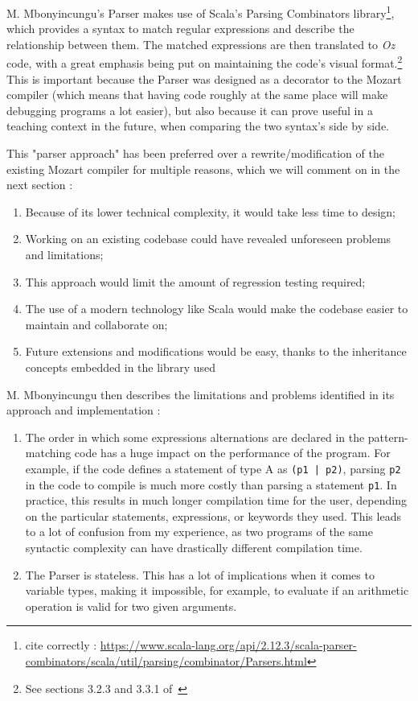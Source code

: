 M. Mbonyincungu's Parser makes use of Scala's Parsing Combinators library\footnote{cite correctly : \url{https://www.scala-lang.org/api/2.12.3/scala-parser-combinators/scala/util/parsing/combinator/Parsers.html}}, which provides a syntax to match regular expressions and describe the relationship between them.
The matched expressions are then translated to \textit{Oz} code, with a great emphasis being put on maintaining the code's visual format.\footnote{See sections 3.2.3 and 3.3.1 of~\cite{jpthesis}}
This is important because the Parser was designed as a decorator to the Mozart compiler (which means that having code roughly at the same place will make debugging programs a lot easier), but also because it can prove useful in a teaching context in the future, when comparing the two syntax's side by side.

This "parser approach" has been preferred over a rewrite/modification of the existing Mozart compiler for multiple reasons, which we will comment on in the next section :
\begin{enumerate}
    \item Because of its lower technical complexity, it would take less time to design;
    \item Working on an existing codebase could have revealed unforeseen problems and limitations;
    \item This approach would limit the amount of regression testing required;
    \item The use of a modern technology like Scala would make the codebase easier to maintain and collaborate on;
    \item Future extensions and modifications would be easy, thanks to the inheritance concepts embedded in the library used
\end{enumerate}
M. Mbonyincungu then describes the limitations and problems identified in its approach and implementation :
\begin{enumerate}[resume]
    \item The order in which some expressions alternations are declared in the pattern-matching code has a huge impact on the performance of the program.
    For example, if the code defines a statement of type A as \texttt{(p1 | p2)}, parsing \texttt{p2} in the code to compile is much more costly than parsing a statement \texttt{p1}.
    In practice, this results in much longer compilation time for the user, depending on the particular statements, expressions, or keywords they used.
    This leads to a lot of confusion from my experience, as two programs of the same syntactic complexity can have drastically different compilation time.
    \item The Parser is stateless.
    This has a lot of implications when it comes to variable types, making it impossible, for example, to evaluate if an arithmetic operation is valid for two given arguments.
\end{enumerate}

